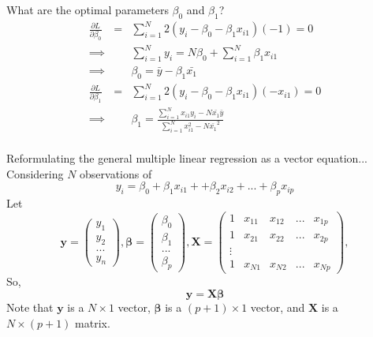 \documentclass[aspectratio=169]{beamer}
\let \vec \mathbf
\begin{document}
    \begin{frame}{What are the optimal parameters $\beta_0$ and $\beta_1$?}
    \begin{eqnarray*}
        \frac{\partial L}{\partial\beta_0} & = & \sum_{i=1}^N 2 (y_i - \beta_0 - \beta_1 x_{i1})(-1) = 0\\
        \implies & & \sum_{i=1}^N y_i = N \beta_0 + \sum_{i=1}^N \beta_1 x_{i1} \\
        \implies & & \beta_0 = \bar{y} - \beta_1 \bar{x_{1}} \\
        \frac{\partial L}{\partial\beta_1} & = & \sum_{i=1}^N 2 (y_i - \beta_0 - \beta_1 x_{i1}) (-x_{i1}) = 0\\
        \implies & & \beta_1 = \frac{\sum_{i=1}^N x_{i1} y_i - N \bar{x_1}\bar{y}}{\sum_{i=1}^N x_{i1}^2 - N \bar{x_1}^2}\\
    \end{eqnarray*}
    \end{frame}

    \begin{frame}{Reformulating the general multiple linear regression as a vector equation...}
    Considering $N$ observations of
    \begin{equation*}
        y_i = \beta_0 + \beta_1 x_{i1} + + \beta_2 x_{i2} + ... + \beta_p x_{ip}
    \end{equation*}
    Let
    \begin{equation*}
        \vec{y} = \begin{pmatrix}y_1\\y_2\\...\\y_n\end{pmatrix}, \bm{\beta} = \begin{pmatrix}\beta_0\\\beta_1\\...\\\beta_p\end{pmatrix}, \vec{X} = \begin{pmatrix}1 & x_{11} & x_{12} & ... & x_{1p}\\
        1 & x_{21} & x_{22} & ... & x_{2p}\\
        \vdots & & & & \\
        1 & x_{N1} & x_{N2} & ... & x_{Np}\end{pmatrix}, 
    \end{equation*}
    So, 
    \begin{equation*}
        \vec{y} = \vec{X}\bm{\beta} 
    \end{equation*}
    Note that $\vec{y}$ is a $N \times 1$ vector,
    $\bm{\beta}$ is a $(p+1) \times 1$ vector, and $\vec{X}$ is a  $N \times (p+1)$ matrix.
\end{frame}
\end{document}
